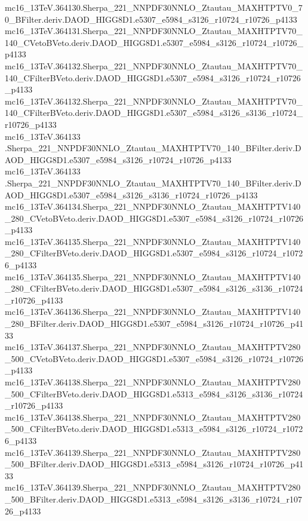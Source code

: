 mc16_13TeV.364130.Sherpa_221_NNPDF30NNLO_Ztautau_MAXHTPTV0_70_BFilter.deriv.DAOD_HIGG8D1.e5307_e5984_s3126_r10724_r10726_p4133 \\
mc16_13TeV.364131.Sherpa_221_NNPDF30NNLO_Ztautau_MAXHTPTV70_140_CVetoBVeto.deriv.DAOD_HIGG8D1.e5307_e5984_s3126_r10724_r10726_p4133 \\
mc16_13TeV.364132.Sherpa_221_NNPDF30NNLO_Ztautau_MAXHTPTV70_140_CFilterBVeto.deriv.DAOD_HIGG8D1.e5307_e5984_s3126_r10724_r10726_p4133 \\
mc16_13TeV.364132.Sherpa_221_NNPDF30NNLO_Ztautau_MAXHTPTV70_140_CFilterBVeto.deriv.DAOD_HIGG8D1.e5307_e5984_s3126_s3136_r10724_r10726_p4133 \\
mc16_13TeV.364133 \\.Sherpa_221_NNPDF30NNLO_Ztautau_MAXHTPTV70_140_BFilter.deriv.DAOD_HIGG8D1.e5307_e5984_s3126_r10724_r10726_p4133 \\
mc16_13TeV.364133 \\.Sherpa_221_NNPDF30NNLO_Ztautau_MAXHTPTV70_140_BFilter.deriv.DAOD_HIGG8D1.e5307_e5984_s3126_s3136_r10724_r10726_p4133 \\
mc16_13TeV.364134.Sherpa_221_NNPDF30NNLO_Ztautau_MAXHTPTV140_280_CVetoBVeto.deriv.DAOD_HIGG8D1.e5307_e5984_s3126_r10724_r10726_p4133 \\
mc16_13TeV.364135.Sherpa_221_NNPDF30NNLO_Ztautau_MAXHTPTV140_280_CFilterBVeto.deriv.DAOD_HIGG8D1.e5307_e5984_s3126_r10724_r10726_p4133 \\
mc16_13TeV.364135.Sherpa_221_NNPDF30NNLO_Ztautau_MAXHTPTV140_280_CFilterBVeto.deriv.DAOD_HIGG8D1.e5307_e5984_s3126_s3136_r10724_r10726_p4133 \\
mc16_13TeV.364136.Sherpa_221_NNPDF30NNLO_Ztautau_MAXHTPTV140_280_BFilter.deriv.DAOD_HIGG8D1.e5307_e5984_s3126_r10724_r10726_p4133 \\
mc16_13TeV.364137.Sherpa_221_NNPDF30NNLO_Ztautau_MAXHTPTV280_500_CVetoBVeto.deriv.DAOD_HIGG8D1.e5307_e5984_s3126_r10724_r10726_p4133 \\
mc16_13TeV.364138.Sherpa_221_NNPDF30NNLO_Ztautau_MAXHTPTV280_500_CFilterBVeto.deriv.DAOD_HIGG8D1.e5313_e5984_s3126_s3136_r10724_r10726_p4133 \\
mc16_13TeV.364138.Sherpa_221_NNPDF30NNLO_Ztautau_MAXHTPTV280_500_CFilterBVeto.deriv.DAOD_HIGG8D1.e5313_e5984_s3126_r10724_r10726_p4133 \\
mc16_13TeV.364139.Sherpa_221_NNPDF30NNLO_Ztautau_MAXHTPTV280_500_BFilter.deriv.DAOD_HIGG8D1.e5313_e5984_s3126_r10724_r10726_p4133 \\
mc16_13TeV.364139.Sherpa_221_NNPDF30NNLO_Ztautau_MAXHTPTV280_500_BFilter.deriv.DAOD_HIGG8D1.e5313_e5984_s3126_s3136_r10724_r10726_p4133 \\
